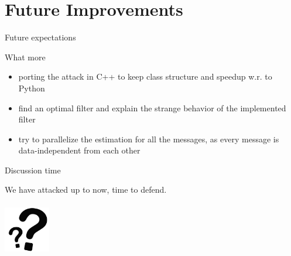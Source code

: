 \documentclass[aspectratio=169]{beamer}
\begin{document}
\section{Future Improvements}
\begin{frame}{Future expectations}
  \begin{block}{What more}
    \begin{itemize}
      \pause \item porting the attack in C++ to keep class structure and speedup w.r. to Python
      \pause \item find an optimal filter and explain the strange behavior of the implemented filter
      \pause \item try to parallelize the estimation for all the messages, as every message is data-independent from each other
    \end{itemize}
  \end{block}
\end{frame}

\begin{frame}[c]{Discussion time}
  \begin{center}
    We have attacked up to now, time to defend.\\
    \Huge{\color{red}{Questions?}}\\
    \vfill
    \hfill
    \includegraphics[height=2cm]{./graphics/qm}
  \end{center}
\end{frame}
\end{document}
